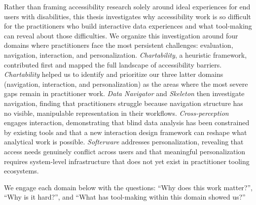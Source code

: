 \documentclass[12pt]{cmuthesis}
\begin{document}
Rather than framing accessibility research solely around ideal experiences for end users with disabilities, this thesis investigates why accessibility work is so difficult for the practitioners who build interactive data experiences and what tool-making can reveal about those difficulties. We organize this investigation around four domains where practitioners face the most persistent challenges: evaluation, navigation, interaction, and personalization. \textit{Chartability}, a heuristic framework, contributed first and mapped the full landscape of accessibility barriers. \textit{Chartability} helped us to identify and prioritize our three latter domains (navigation, interaction, and personalization) as the areas where the most severe gaps remain in practitioner work. \textit{Data Navigator} and \textit{Skeleton} then investigate navigation, finding that practitioners struggle because navigation structure has no visible, manipulable representation in their workflows. \textit{Cross-perception} engages interaction, demonstrating that blind data analysis has been constrained by existing tools and that a new interaction design framework can reshape what analytical work is possible. \textit{Softerware} addresses personalization, revealing that access needs genuinely conflict across users and that meaningful personalization requires system-level infrastructure that does not yet exist in practitioner tooling ecosystems.

We engage each domain below with the questions: ``Why does this work matter?'', ``Why is it hard?'', and ``What has tool-making within this domain showed us?''

\end{document}

